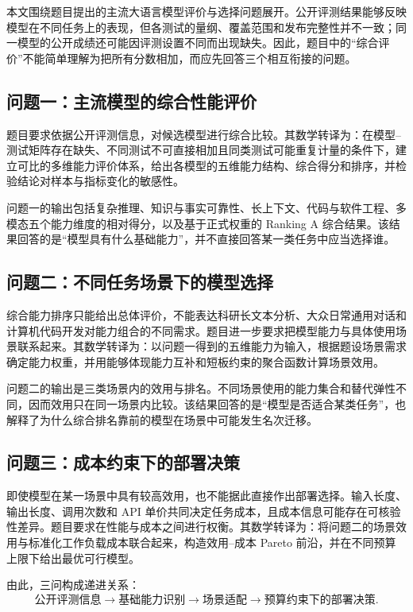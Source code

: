 本文围绕题目提出的主流大语言模型评价与选择问题展开。公开评测结果能够反映模型在不同任务上的表现，但各测试的量纲、覆盖范围和发布完整性并不一致；同一模型的公开成绩还可能因评测设置不同而出现缺失。因此，题目中的“综合评价”不能简单理解为把所有分数相加，而应先回答三个相互衔接的问题。

\subsection{问题一：主流模型的综合性能评价}

题目要求依据公开评测信息，对候选模型进行综合比较。其数学转译为：在模型--测试矩阵存在缺失、不同测试不可直接相加且同类测试可能重复计量的条件下，建立可比的多维能力评价体系，给出各模型的五维能力结构、综合得分和排序，并检验结论对样本与指标变化的敏感性。

问题一的输出包括复杂推理、知识与事实可靠性、长上下文、代码与软件工程、多模态五个能力维度的相对得分，以及基于正式权重的 Ranking A 综合结果。该结果回答的是“模型具有什么基础能力”，并不直接回答某一类任务中应当选择谁。

\subsection{问题二：不同任务场景下的模型选择}

综合能力排序只能给出总体评价，不能表达科研长文本分析、大众日常通用对话和计算机代码开发对能力组合的不同需求。题目进一步要求把模型能力与具体使用场景联系起来。其数学转译为：以问题一得到的五维能力为输入，根据题设场景需求确定能力权重，并用能够体现能力互补和短板约束的聚合函数计算场景效用。

问题二的输出是三类场景内的效用与排名。不同场景使用的能力集合和替代弹性不同，因而效用只在同一场景内比较。该结果回答的是“模型是否适合某类任务”，也解释了为什么综合排名靠前的模型在场景中可能发生名次迁移。

\subsection{问题三：成本约束下的部署决策}

即使模型在某一场景中具有较高效用，也不能据此直接作出部署选择。输入长度、输出长度、调用次数和 API 单价共同决定任务成本，且成本信息可能存在可核验性差异。题目要求在性能与成本之间进行权衡。其数学转译为：将问题二的场景效用与标准化工作负载成本联合起来，构造效用--成本 Pareto 前沿，并在不同预算上限下给出最优可行模型。

由此，三问构成递进关系：
\[
\text{公开评测信息}
\longrightarrow
\text{基础能力识别}
\longrightarrow
\text{场景适配}
\longrightarrow
\text{预算约束下的部署决策}.
\]
